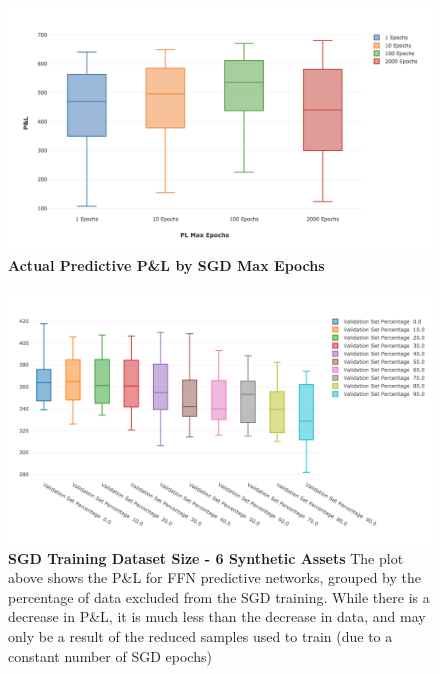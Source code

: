 \documentclass[a4paper,11pt,oneside]{article}
\theoremstyle{plain}
\theoremstyle{definition}
\begin{document}

\begin{figure}[H]
	\centering 
	\includegraphics[scale=0.3]{images/results/data/max_epochs_actual.png}
	\caption{\textbf{Actual Predictive P\&L by SGD Max Epochs} 
		\newline }
	\label{figure-results_pl_max_epochs}
\end{figure}


\begin{figure}[H]
	\centering \includegraphics[scale=0.3]{images/iteration_three/it3_validationset.png}
	\caption{\textbf{SGD Training Dataset Size - 6 Synthetic Assets} \newline The plot above shows the P\&L for FFN predictive networks, grouped by the percentage of data excluded from the SGD training. While there is a decrease in P\&L, it is much less than the decrease in data, and may only be a result of the reduced samples used to train (due to a constant number of SGD epochs)}
	\label{figure-results_it3_validationset}
\end{figure}
\end{document}
